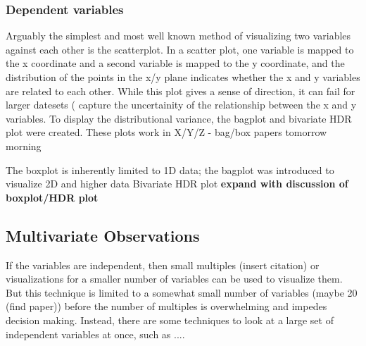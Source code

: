 \documentclass[../main.tex]{subfiles}
\begin{document}
\subsubsection{Dependent variables}
Arguably the simplest and most well known method of visualizing two
variables against each other is the scatterplot\cite{friendly2005}. In
a scatter plot, one variable is mapped to the x coordinate and a
second variable is mapped to the y coordinate, and the distribution of the
points in the x/y plane indicates whether the x and y variables are related to
each other. While this plot gives a sense of direction, it can fail for larger
datesets (%
capture the uncertainity of the relationship between the x and y variables. To
display the distributional variance, the bagplot and bivariate HDR plot were
created. These plots work in X/Y/Z - bag/box papers tomorrow morning

\begin{figure}
  \end{figure}
  The boxplot is inherently limited to 1D data; the bagplot was
  introduced to
  visualize 2D and higher data \cite{rousseeuw1999}
  Bivariate HDR plot \cite{hyndman1996} \textbf{expand with discussion
  of
    boxplot/HDR plot}
    


\subsection{Multivariate Observations}
If the variables are independent, then small multiples (insert citation) or
visualizations for a smaller number of variables can be used to visualize
them. But this technique is limited to a somewhat small number of variables
(maybe 20 (find paper)) before the number of multiples is overwhelming and
impedes decision making. Instead, there are some techniques to look at a large
set of independent variables at once, such as ....


\end{document}
